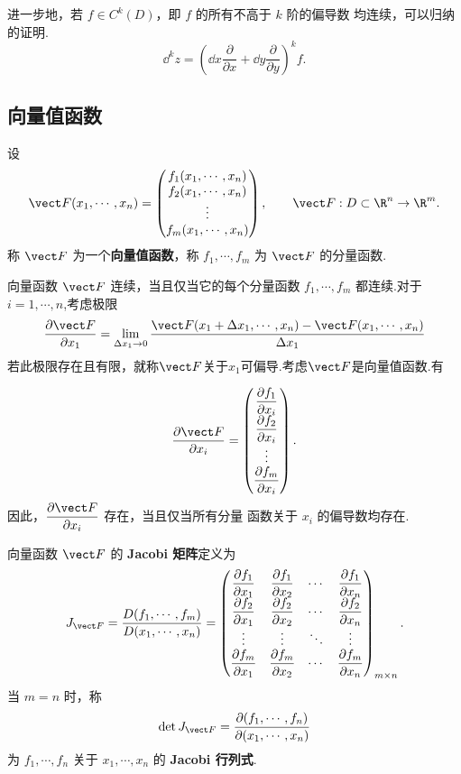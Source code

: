 进一步地，若 $f\in C^k(D)$，即 $f$ 的所有不高于 $k$ 阶的偏导数
均连续，可以归纳的证明.
\[
\dd^kz
=
\left(
\dd x\frac{\partial}{\partial x}
+\dd y\frac{\partial}{\partial y}
\right)^kf.
\]

\subsection*{向量值函数}

\begin{definition}
	设
	\[
	\vect F(x_1,\cdots,x_n)
	=
	\begin{pmatrix}
	f_1(x_1,\cdots,x_n)\\
	f_2(x_1,\cdots,x_n)\\
	\vdots\\
	f_m(x_1,\cdots,x_n)
	\end{pmatrix},
	\qquad
	\vect F:D\subset\R^n\to\R^m.
	\]
	称 $\vect F$ 为一个\textbf{向量值函数}，称
	$f_1,\cdots,f_m$ 为 $\vect F$ 的分量函数.
\end{definition}

向量函数 $\vect F$ 连续，当且仅当它的每个分量函数
$f_1,\cdots,f_m$ 都连续.对于 $i=1,\cdots,n$,考虑极限
\[\frac{\partial \vect F}{\partial x_1}=\lim\limits_{\Delta x_1\to 0 }\frac{\vect F(x_1+\Delta x_1,\cdots,x_n)-\vect F(x_1,\cdots,x_n)}{\Delta x_1}\]
若此极限存在且有限，就称$ \vect F$关于$x_1$可偏导.考虑$\vect F $是向量值函数.有

\[
\frac{\partial\vect F}{\partial x_i}
=
\begin{pmatrix}
\dfrac{\partial f_1}{\partial x_i}\\[4pt]
\dfrac{\partial f_2}{\partial x_i}\\
\vdots\\
\dfrac{\partial f_m}{\partial x_i}
\end{pmatrix}.
\]
因此，$\dfrac{\partial\vect F}{\partial x_i}$ 存在，当且仅当所有分量
函数关于 $x_i$ 的偏导数均存在.

\begin{definition}
	向量函数 $\vect F$ 的 \textbf{Jacobi 矩阵}定义为
	\[
	J_{\vect F}
	=
	\frac{D(f_1,\cdots,f_m)}
	{D(x_1,\cdots,x_n)}
	=
	\begin{pmatrix}
	\dfrac{\partial f_1}{\partial x_1}
	&\dfrac{\partial f_1}{\partial x_2}
	&\cdots
	&\dfrac{\partial f_1}{\partial x_n}\\[5pt]
	\dfrac{\partial f_2}{\partial x_1}
	&\dfrac{\partial f_2}{\partial x_2}
	&\cdots
	&\dfrac{\partial f_2}{\partial x_n}\\
	\vdots&\vdots&\ddots&\vdots\\
	\dfrac{\partial f_m}{\partial x_1}
	&\dfrac{\partial f_m}{\partial x_2}
	&\cdots
	&\dfrac{\partial f_m}{\partial x_n}
	\end{pmatrix}_{m\times n}.
	\]
	当 $m=n$ 时，称
	\[
	\det J_{\vect F}
	=
	\frac{\partial(f_1,\cdots,f_n)}
	{\partial(x_1,\cdots,x_n)}
	\]
	为 $f_1,\cdots,f_n$ 关于 $x_1,\cdots,x_n$ 的
	\textbf{Jacobi 行列式}.
\end{definition}

